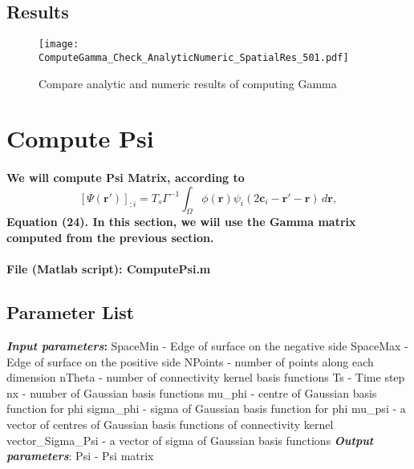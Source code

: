 \documentclass[a4paper, 12pt, english]{article}
\begin{document}
\subsection{Results}
\begin{figure}[H]
\centering
\texttt{[image: ComputeGamma\_Check\_AnalyticNumeric\_SpatialRes\_501.pdf]}
\caption{Compare analytic and numeric results of computing Gamma}
\end{figure}

\newpage



\section{Compute Psi}
\paragraph{We will compute Psi Matrix, according to
$$[\Psi(\boldsymbol{r}\prime)]_{:i}= T_s\Gamma^{-1}\int_{\Omega}\phi(\boldsymbol{r})\psi_i(2\boldsymbol{c}_i-\boldsymbol{r}\prime- \boldsymbol{r})\,d\boldsymbol{r},$$ 
Equation (24). In this section, we
wiil use the Gamma matrix computed from the previous section.}
\paragraph{File (Matlab script): ComputePsi.m}


\subsection{Parameter List}
\textbf{\textit{Input parameters}:}\newline
SpaceMin - Edge of surface on the negative side \newline
SpaceMax - Edge of surface on the positive side \newline
NPoints - number of points along each dimension \newline
nTheta - number of connectivity kernel basis functions \newline
Ts - Time step \newline
nx - number of Gaussian basis functions \newline
mu\_phi - centre of Gaussian basis function for phi \newline
sigma\_phi - sigma of Gaussian basis function for phi \newline
mu\_psi - a vector of centres of Gaussian basis functions of connectivity kernel \newline
vector\_Sigma\_Psi - a vector of sigma of Gaussian basis functions \newline
\textbf{\textit{Output parameters}}:\newline
Psi - Psi matrix
\end{document}
